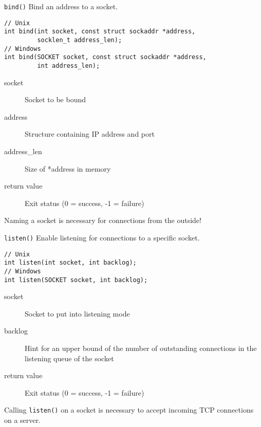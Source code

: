 
\begin{frame}[fragile]{\texttt{bind()}}
    Bind an address to a socket.
    \begin{lstlisting}[numbers=none,morekeywords={*,SOCKET,socklen_t,sockaddr}]
// Unix
int bind(int socket, const struct sockaddr *address,
         socklen_t address_len);
// Windows
int bind(SOCKET socket, const struct sockaddr *address,
         int address_len);
\end{lstlisting}
    \begin{description}
        \item[socket] Socket to be bound
        \item[address] Structure containing IP address and port
        \item[address\_len] Size of *address in memory
        \item[return value] Exit status (0 = success, -1 = failure)
    \end{description}
    \bigskip
    Naming a socket is necessary for connections from the outside!
\end{frame}


\begin{frame}[fragile]{\texttt{listen()}}
    Enable listening for connections to a specific socket.
    \begin{lstlisting}[numbers=none,morekeywords={*,SOCKET}]
// Unix
int listen(int socket, int backlog);
// Windows
int listen(SOCKET socket, int backlog);
\end{lstlisting}
    \begin{description}
        \item[socket] Socket to put into listening mode
        \item[backlog] Hint for an upper bound of the number of outstanding
            connections in the listening queue of the socket
        \item[return value] Exit status (0 = success, -1 = failure)
    \end{description}
    \bigskip
    Calling \texttt{listen()} on a socket is necessary to accept incoming TCP
    connections on a server.
\end{frame}


